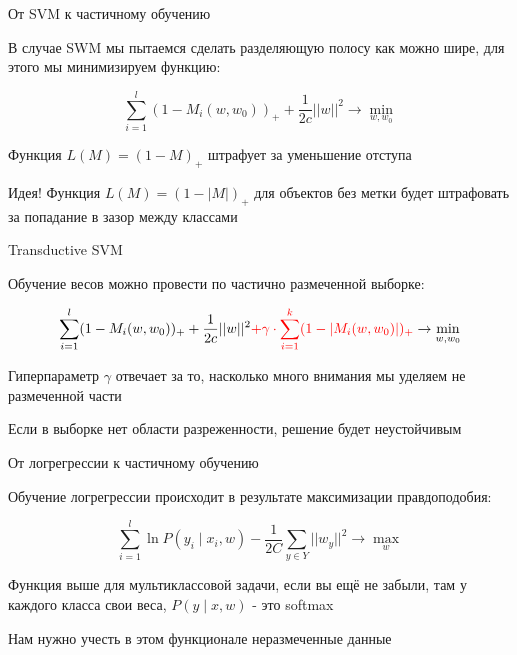 \documentclass[notes,12pt, aspectratio=169]{beamer}
\newenvironment{wideitemize}{\itemize\addtolength{\itemsep}{10pt}}{\enditemize}
\begin{document}
\begin{frame}{От SVM к частичному обучению}
\begin{wideitemize}
\item 	В случае SWM мы пытаемся сделать разделяющую полосу как можно шире, для этого мы минимизируем функцию: 

$$
\sum_{i=1}^l (1 - M_i(w,w_0))_{+} + \frac{1}{2c} ||w||^2 \to \min_{w, w_0}
$$
	
\item Функция $L(M) = (1 - M)_{+}$ штрафует за уменьшение отступа

\item \alert{Идея!} Функция $L(M) = (1 - |M|)_{+}$ для объектов без метки будет штрафовать за попадание в зазор между классами	
\end{wideitemize}
\end{frame}


\begin{frame}{Transductive SVM}
\begin{wideitemize}
	\item  Обучение весов можно провести по частично размеченной выборке: 
	
	$$
	\sum_{i=1}^l (1 - M_i(w,w_0))_{+} + \frac{1}{2c} ||w||^2  { \color{red} + \gamma \cdot \sum_{i = 1}^k (1 - |M_i(w,w_0)|)_{+}	
}
	\to \min_{w, w_0}
	$$

	\item Гиперпараметр $\gamma$ отвечает за то, насколько много внимания мы уделяем не размеченной части 
	
	\item Если в выборке нет области разреженности, решение будет неустойчивым
\end{wideitemize}
\end{frame}


\begin{frame}{От логрегрессии к частичному обучению}
\begin{wideitemize}
	\item Обучение логрегрессии происходит в результате максимизации правдоподобия: 

$$
\sum_{i=1}^l \ln P(y_i \mid x_i, w) - \frac{1}{2C} \sum_{y \in Y} ||w_y||^2 \to \max_{w}
$$

	\item Функция выше для мультиклассовой задачи, если вы ещё не забыли, там у каждого класса свои веса, $P(y \mid x, w)$ - это softmax 
	
	\item Нам нужно учесть в этом функционале неразмеченные данные 
\end{wideitemize}
\end{frame}
\end{document}
